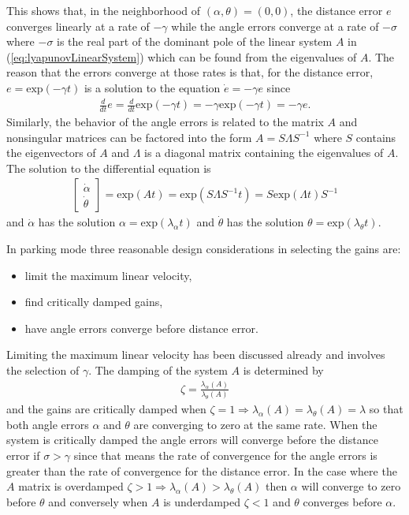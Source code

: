 This shows that, in the neighborhood of $(\alpha, \theta)=(0, 0)$, the distance error $e$ converges linearly at a rate of $-\gamma$ while the angle errors converge at a rate of $-\sigma$ where $-\sigma$ is the real part of the dominant pole of the linear system $A$ in (\ref{eq:lyapunovLinearSystem}) which can be found from the eigenvalues of $A$. The reason that the errors converge at those rates is that, for the distance error, $e=\text{exp}(-\gamma t)$ is a solution to the equation $\dot{e}=-\gamma e$ since 
\begin{align*}
\tfrac{d}{dt}e=\tfrac{d}{dt}\text{exp}(-\gamma t) = -\gamma \text{exp}(-\gamma t)=-\gamma e.
\end{align*}
Similarly, the behavior of the angle errors is related to the matrix $A$ and nonsingular matrices can be factored into the form $A=S\Lambda S^{-1}$ where $S$ contains the eigenvectors of $A$ and $\Lambda$ is a diagonal matrix containing the eigenvalues of $A$. The solution to the differential equation is
\begin{align*}
\left[\begin{array}{c} \dot{\alpha} \\ \dot{\theta} \end{array}\right] = \text{exp}(At)=\text{exp}(S\Lambda S^{-1}t)=S\text{exp}(\Lambda t)S^{-1}
\end{align*}
and $\dot{\alpha}$ has the solution $\alpha=\text{exp}(\lambda_\alpha t)$ and $\dot{\theta}$ has the solution $\theta=\text{exp}(\lambda_\theta t)$.

In parking mode three reasonable design considerations in selecting the gains are:
\begin{itemize}
\item limit the maximum linear velocity,
\item find critically damped gains,
\item have angle errors converge before distance error.
\end{itemize}
Limiting the maximum linear velocity has been discussed already and involves the selection of $\gamma$. The damping of the system $A$ is determined by
\begin{align*}
\zeta = \frac{\lambda_\alpha(A)}{\lambda_\theta(A)}
\end{align*}
and the gains are critically damped when $\zeta = 1 \Rightarrow \lambda_\alpha(A)=\lambda_\theta(A)=\lambda$ so that both angle errors $\alpha$ and $\theta$ are converging to zero at the same rate. When the system is critically damped the angle errors will converge before the distance error if $\sigma>\gamma$ since that means the rate of convergence for the angle errors is greater than the rate of convergence for the distance error. In the case where the $A$ matrix is overdamped $\zeta > 1 \Rightarrow \lambda_\alpha(A) > \lambda_\theta(A)$ then $\alpha$ will converge to zero before $\theta$ and conversely when $A$ is underdamped $\zeta < 1$ and $\theta$ converges before $\alpha$.

